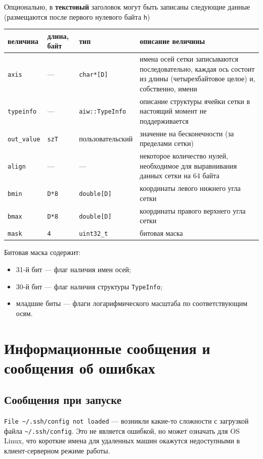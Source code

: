 \documentclass[12pt]{article}
\begin{document}
\begin{enumrate}
Опционально, в {\bf текстовый} заголовок могут быть записаны следующие данные (размещаются после первого нулевого байта {\tt h})
\begin{center}
\begin{tabular}{|p{}|p{}|p{}|p{}|}
\hline
величина & длина, байт & тип & описание величины \\
\hline
  {\tt axis} & --- & {\tt char*[D]} & имена осей сетки записываются последовательно, каждая ось состоит из длины (четырехбайтовое целое) и, собственно, имени\\
  {\tt typeinfo} & --- & {\tt aiw::TypeInfo} & описание структуры ячейки сетки в настоящий момент не поддерживается \\
  {\tt out\_value} & {\tt szT} & пользовательский & значение на бесконечности (за пределами сетки) \\
  {\tt align} & --- & --- & некоторое количество нулей, необходимое для выравнивания данных сетки на 64 байта \\
  {\tt bmin} & {\tt D*8} & {\tt double[D]} & координаты левого нижнего угла сетки \\
  {\tt bmax} & {\tt D*8} & {\tt double[D]} & координаты правого верхнего угла сетки \\
  {\tt mask} & {\tt 4} & {\tt uint32\_t} & битовая маска \\  
  \hline
\end{tabular}
\end{center}
Битовая маска содержит:
\begin{itemize}
  \item 31-й бит --- флаг наличия имен осей;
  \item 30-й бит --- флаг наличия структуры {\tt TypeInfo};
  \item младшие биты --- флаги логарифмического масштаба по соответствующим осям.
\end{itemize}
\section{Информационные сообщения и сообщения об ошибках}  
\subsection{Сообщения при запуске}
\verb'File ~/.ssh/config not loaded' --- возникли какие-то сложности с загрузкой файла \verb'~/.ssh/config'.
Это не является ошибкой, но может означать для OS Linux, что короткие имена для удаленных машин окажутся недоступными в клиент-серверном режиме работы.


\end{enumrate}
\end{document}
